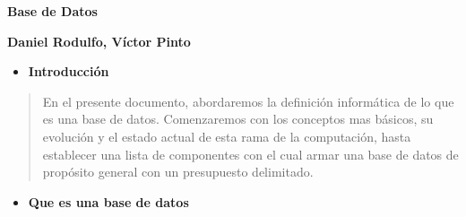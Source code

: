 \documentclass[14pt]{extarticle}
\author{}
\date{}
\begin{document}
\textbf{Base de Datos}

\textbf{Daniel Rodulfo, Víctor Pinto}

\begin{itemize}
\item
  \textbf{Introducción}
\end{itemize}

\begin{quote}
En el presente documento, abordaremos la definición informática de lo
que es una base de datos. Comenzaremos con los conceptos mas básicos, su
evolución y el estado actual de esta rama de la computación, hasta
establecer una lista de componentes con el cual armar una base de datos
de propósito general con un presupuesto delimitado.
\end{quote}

\begin{itemize}
\item
  \textbf{Que es una base de datos}
\end{itemize}
\end{document}
